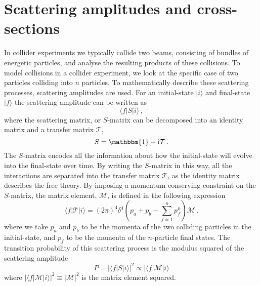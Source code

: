 \documentclass[main.tex]{subfiles}
\begin{document}
\section{Scattering amplitudes and cross-sections}
    In collider experiments we typically collide
    two beams, consisting of bundles of energetic
    particles, and analyse the resulting products
    of these collisions. To model collisions in
    a collider experiment, we look at the specific
    case of two particles colliding into $n$ particles.
    To mathematically describe these
    scattering processes, scattering amplitudes are used.
    For an initial-state
    $|i\rangle$ and final-state $|f\rangle$
    the scattering amplitude can be written as
    \begin{equation}\label{eqn:scattering}
        \langle f | S | i \rangle \, ,
    \end{equation}
    where the scattering matrix, or $S$-matrix
    can be decomposed into an identity matrix
    and a transfer matrix $\mathcal{T}$,
    \begin{equation}\label{eqn:S_matrix}
        S = \mathbbm{1} + \mathrm{i}\mathcal{T} \, .
    \end{equation}
    The $S$-matrix encodes all the information
    about how the initial-state will evolve
    into the final-state over time. By writing
    the $S$-matrix in this way, all the interactions
    are separated into the transfer matrix $\mathcal{T}$,
    as the identity matrix describes the free theory.
    By imposing a momentum conserving constraint
    on the $S$-matrix, the matrix element,
    $\mathcal{M}$, is defined in the following expression
    \begin{equation}\label{eqn:matrix_element}
        \langle f | \mathcal{T} | i \rangle = (2\pi)^{4} \delta^{4}\left(p_{a} + p_{b} - \sum_{f=1}^{n} p_{f}^{\mu}\right) \mathcal{M} \, .
    \end{equation}
    where we take $p_{a}$ and $p_{b}$ to be
    the momenta of the two colliding
    particles in the initial-state, and $p_{f}$ to be the
    momenta of the $n$-particle final states.
    The transition probability of this scattering process
    is the modulus squared of the scattering amplitude
    \begin{equation}\label{eqn:S_prob}
        P = |\langle f | S | i \rangle|^{2} \propto |\langle f | \mathcal{M} | i \rangle 
    \end{equation}
    where $|\langle f | \mathcal{M} | i \rangle|^{2}  \equiv |\mathcal{M}|^{2}$
    is the matrix element squared.
\end{document}
